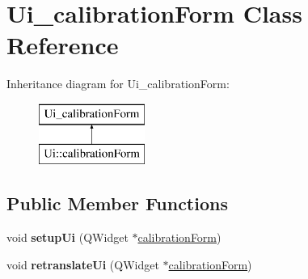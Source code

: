 \hypertarget{class_ui__calibration_form}{}\section{Ui\+\_\+calibration\+Form Class Reference}
\label{class_ui__calibration_form}
Inheritance diagram for Ui\+\_\+calibration\+Form\+:\begin{figure}[H]
\begin{center}
\leavevmode
\includegraphics[height=2.000000cm]{class_ui__calibration_form}
\end{center}
\end{figure}
\subsection*{Public Member Functions}
\begin{DoxyCompactItemize}
\item 
\hypertarget{class_ui__calibration_form_ab284aff5632f3cba8f1c3d4e0437aacc}{}void {\bfseries setup\+Ui} (Q\+Widget $\ast$\hyperlink{classcalibration_form}{calibration\+Form})\label{class_ui__calibration_form_ab284aff5632f3cba8f1c3d4e0437aacc}

\item 
\hypertarget{class_ui__calibration_form_af92e3883ecb47c35e0254006b42ad50a}{}void {\bfseries retranslate\+Ui} (Q\+Widget $\ast$\hyperlink{classcalibration_form}{calibration\+Form})\label{class_ui__calibration_form_af92e3883ecb47c35e0254006b42ad50a}

\end{DoxyCompactItemize}
